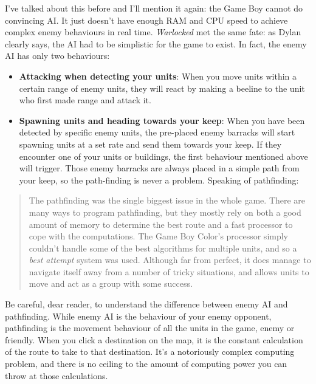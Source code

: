 \documentclass{book}
\begin{document}
\FloatBarrier\vspace{\baselineskip}\begin{figure}[H]\end{figure}
I’ve talked about this before and I’ll mention it again: the Game Boy cannot do convincing AI. It just doesn’t have enough RAM and CPU speed to achieve complex enemy behaviours in real time. \emph{Warlocked} met the same fate: as Dylan clearly says, the AI had to be simplistic for the game to exist. In fact, the enemy AI has only two behaviours:\par
\begin{itemize}

\item \textbf{Attacking when detecting your units}: When you move units within a certain range of enemy units, they will react by making a beeline to the unit who first made range and attack it.
\item \textbf{Spawning units and heading towards your keep}: When you have been detected by specific enemy units, the pre-placed enemy barracks will start spawning units at a set rate and send them towards your keep. If they encounter one of your units or buildings, the first behaviour mentioned above will trigger. Those enemy barracks are always placed in a simple path from your keep, so the path-finding is never a problem. Speaking of pathfinding:

\end{itemize}
\begin{quote}
The pathfinding was the single biggest issue in the whole game. There are many ways to program pathfinding, but they mostly rely on both a good amount of memory to determine the best route and a fast processor to cope with the computations. The Game Boy Color’s processor simply couldn’t handle some of the best algorithms for multiple units, and so a \emph{best attempt} system was used. Although far from perfect, it does manage to navigate itself away from a number of tricky situations, and allows units to move and act as a group with some success.\par
\end{quote} \par
Be careful, dear reader, to understand the difference between enemy AI and pathfinding. While enemy AI is the behaviour of your enemy opponent, pathfinding is the movement behaviour of all the units in the game, enemy or friendly. When you click a destination on the map, it is the constant calculation of the route to take to that destination. It’s a notoriously complex computing problem, and there is no ceiling to the amount of computing power you can throw at those calculations.\par
\end{document}
